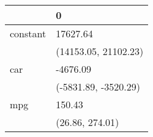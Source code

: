 \begin{tabular}{ll}
\toprule
{} &                     0 \\
\midrule
constant &              17627.64 \\
         &  (14153.05, 21102.23) \\
car      &              -4676.09 \\
         &  (-5831.89, -3520.29) \\
mpg      &                150.43 \\
         &       (26.86, 274.01) \\
\bottomrule
\end{tabular}
